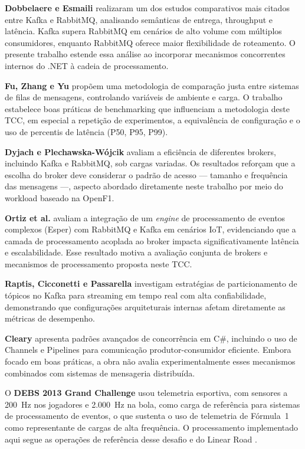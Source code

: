 \documentclass[12pt]{article}
\begin{document}
\textbf{Dobbelaere e Esmaili} \cite{dobbelaere:2017} realizaram um dos estudos comparativos
mais citados entre Kafka e RabbitMQ, analisando semânticas de entrega, throughput e
latência. Kafka supera RabbitMQ em cenários de alto volume com múltiplos consumidores,
enquanto RabbitMQ oferece maior flexibilidade de roteamento. O presente trabalho estende
essa análise ao incorporar mecanismos concorrentes internos do .NET à cadeia de
processamento.

\textbf{Fu, Zhang e Yu} \cite{fu:2021} propõem uma metodologia de comparação justa entre
sistemas de filas de mensagens, controlando variáveis de ambiente e carga. O trabalho
estabelece boas práticas de benchmarking que influenciam a metodologia deste TCC, em
especial a repetição de experimentos, a equivalência de configuração e o uso de
percentis de latência (P50, P95, P99).

\textbf{Dyjach e Plechawska\allowbreak-Wójcik} \cite{dyjach:2024} avaliam a eficiência de diferentes
brokers, incluindo Kafka e RabbitMQ, sob cargas variadas. Os resultados reforçam que a
escolha do broker deve considerar o padrão de acesso — tamanho e frequência das mensagens —,
aspecto abordado diretamente neste trabalho por meio do workload baseado na OpenF1.

\textbf{Ortiz et al.} \cite{ortiz:2023} avaliam a integração de um \textit{engine} de
processamento de eventos complexos (Esper) com RabbitMQ e Kafka em cenários IoT,
evidenciando que a camada de processamento acoplada ao broker impacta significativamente
latência e escalabilidade. Esse resultado motiva a avaliação conjunta de brokers e
mecanismos de processamento proposta neste TCC.

\textbf{Raptis, Cicconetti e Passarella} \cite{raptis:2024} investigam estratégias de
particionamento de tópicos no Kafka para streaming em tempo real com alta confiabilidade,
demonstrando que configurações arquiteturais internas afetam diretamente as métricas de
desempenho.

\textbf{Cleary} \cite{cleary:2019} apresenta padrões avançados de concorrência em C\#,
incluindo o uso de Channels e Pipelines para comunicação produtor-consumidor eficiente.
Embora focado em boas práticas, a obra não avalia experimentalmente esses mecanismos
combinados com sistemas de mensageria distribuída.

O \textbf{DEBS 2013 Grand Challenge} \cite{mutschler:2013} usou telemetria esportiva,
com sensores a 200~Hz nos jogadores e 2.000~Hz na bola, como carga de referência para
sistemas de processamento de eventos, o que sustenta o uso de telemetria de Fórmula~1
como representante de cargas de alta frequência. O processamento implementado aqui segue
as operações de referência desse desafio e do Linear Road \cite{arasu:2004}.
\end{document}
